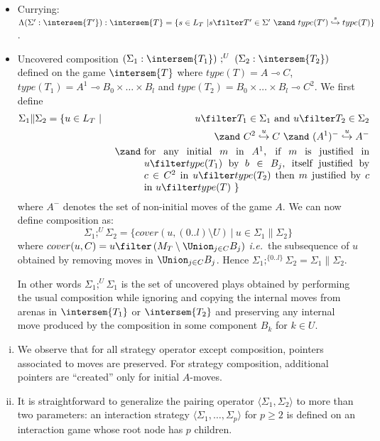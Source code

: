 \begin{definition}
\begin{itemize}[-]
\item Currying: $\Lambda(\Sigma' : \intersem{T'}) : \intersem{T} = \{ s \in L_T \ |  s \filter T' \in \Sigma' \ \zand\ type(T')\stackrel{s}\hookrightarrow type(T) \}$.

\item Uncovered composition $(\Sigma_1 : \intersem{T_1})\ ;^U\ (\Sigma_2
:\intersem{T_2})$ defined on the game $\intersem{T}$ where
$type(T) = A \multimap C$, $type(T_1) = A^1 \multimap B_0 \times
\ldots \times B_l$ and $type(T_2) = B_0 \times \ldots \times B_l
\multimap C^2$. We first define
\begin{eqnarray*}
\Sigma_1 \| \Sigma_2 &= \{ u \in L_T  \ | \ & u \filter T_1 \in \Sigma_1 \mbox{ and } u \filter T_2 \in \Sigma_2 \\
&& \zand\ C^2\stackrel{u}\hookrightarrow C\ \zand\ (A^1)^-\stackrel{u}\hookrightarrow A^-  \\
&& \zand\ \parbox[t]{8cm}{for any initial $m$ in $A^1$, if $m$ is justified in $u \filter type(T_1)$ by $b\in B_j$,
itself justified by $c \in C^2$ in $u \filter type(T_2)$ then $m$ justified by $c$ in $u \filter type(T)$ \} }
\end{eqnarray*}
where $A^-$ denotes the set of non-initial moves of the game $A$. We can now define composition as:
$$ \Sigma_1 ;^U \Sigma_2 = \{ cover(u,(0..l)\setminus U) \ | \ u \in \Sigma_1 \| \Sigma_2 \}$$
where $cover(u,C) = u \filter \left( M_T \setminus \Union_{j\in
C} B_j \right)$ {\it i.e.}~the subsequence of $u$ obtained by
removing moves in $\Union_{j\in C} B_j$. Hence
$\Sigma_1;^{\{0..l\}} \Sigma_2 = \Sigma_1 \| \Sigma_2$.

In other words $\Sigma_1 ;^U \Sigma_1$ is the set of uncovered
plays obtained by performing the usual composition while
ignoring and copying the internal moves from arenas in
$\intersem{T_1}$ or $\intersem{T_2}$ and preserving any internal
move produced by the composition in some component $B_k$ for $k
\in U$.
\end{itemize}
\end{definition}

\begin{remark} \hfill
\label{rem:interstrat}
\begin{enumerate}[i.]
\item We observe that for all strategy operator
except composition, pointers associated to moves are preserved.
For strategy composition, additional pointers are
``created'' only for initial $A$-moves.
\item It is straightforward to generalize the pairing operator $\langle \Sigma_1, \Sigma_2 \rangle$ to more than two parameters: an interaction strategy $\langle \Sigma_1, \ldots, \Sigma_p \rangle$ for $p\geq2$
is defined on an interaction game whose root node has $p$ children.
\end{enumerate}
\end{remark}

